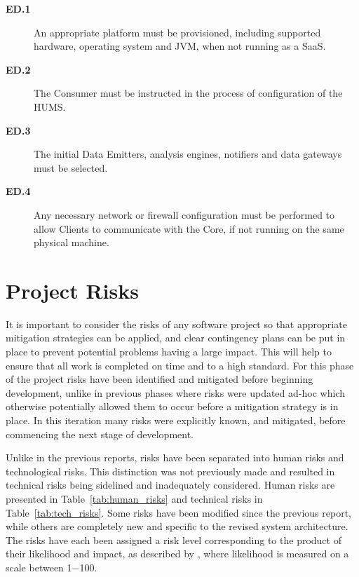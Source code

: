 \documentclass[10pt,a4paper]{article}
\newcommand{\ed}[1]{\textcolor{reqColor}{\textbf{ED.#1}}}
\begin{document}
 \begin{description}
 \item[\ed{1}] An appropriate platform must be provisioned, including supported hardware, operating system and JVM, when not running as a SaaS.
 \item[\ed{2}] The Consumer must be instructed in the process of configuration of the HUMS.
 \item[\ed{3}] The initial Data Emitters, analysis engines, notifiers and data gateways must be selected.
 \item[\ed{4}] Any necessary network or firewall configuration must be performed to allow Clients to communicate with the Core, if not running on the same physical machine.
 \end{description}


\section{Project Risks}
\label{sec:risks}
It is important to consider the risks of any software project so that appropriate mitigation strategies can be applied, and clear contingency plans can be put in place to prevent potential problems having a large impact. This will help to ensure that all work is completed on time and to a high standard. For this phase of the project risks have been identified and mitigated before beginning development, unlike in previous phases where risks were updated ad-hoc which otherwise potentially allowed them to occur before a mitigation strategy is in place. In this iteration many risks were explicitly known, and mitigated, before commencing the next stage of development.

Unlike in the previous reports, risks have been separated into human risks and technological risks. This distinction was not previously made and resulted in technical risks being sidelined and inadequately considered. Human risks are presented in Table~\ref{tab:human_risks} and technical risks in Table~\ref{tab:tech_risks}. Some risks have been modified since the previous report, while others are completely new and specific to the revised system architecture. The risks have each been assigned a risk level corresponding to the product of their likelihood and impact, as described by \cite{risks}, where likelihood is measured on a scale between 1$-$100.
\end{document}

